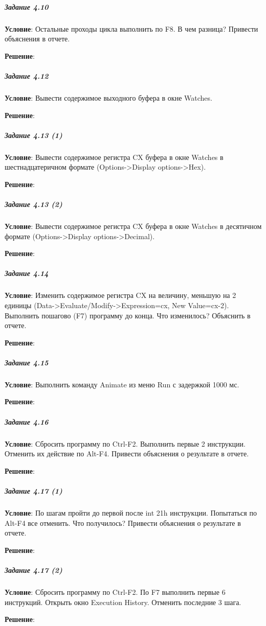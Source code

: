 \subparagraph{Задание 4.10}

\textbf{Условие}:
Остальные проходы цикла выполнить по F8. В чем разница? Привести объяснения в отчете.

\textbf{Решение}:



\subparagraph{Задание 4.12}

\textbf{Условие}: Вывести содержимое выходного буфера в окне Watches. 

\textbf{Решение}:



\subparagraph{Задание 4.13 (1)}

\textbf{Условие}: Вывести содержимое регистра CX буфера в окне Watches в шестнадцатеричном формате (Options->Display options->Hex).

\textbf{Решение}:



\subparagraph{Задание 4.13 (2)}

\textbf{Условие}:
Вывести содержимое регистра CX буфера в окне Watches в десятичном формате (Options->Display options->Decimal).

\textbf{Решение}:



\subparagraph{Задание 4.14}

\textbf{Условие}:
Изменить содержимое регистра CX на величину, меньшую на 2 единицы (Data->Evaluate/Modify->Expression=cx, New Value=cx-2). Выполнить пошагово (F7) программу до конца. Что изменилось? Объяснить в отчете.

\textbf{Решение}:



\subparagraph{Задание 4.15}

\textbf{Условие}:
Выполнить команду Animate из меню Run с задержкой 1000 мс.

\textbf{Решение}:



\subparagraph{Задание 4.16}

\textbf{Условие}:
Сбросить программу по Ctrl-F2. Выполнить первые 2 инструкции. Отменить их действие по Alt-F4. Привести объяснения о результате в отчете.

\textbf{Решение}:



\subparagraph{Задание 4.17 (1)}

\textbf{Условие}:
По шагам пройти до первой после int 21h инструкции. Попытаться по Alt-F4 все отменить. Что получилось? Привести объяснения о результате в отчете.

\textbf{Решение}:



\subparagraph{Задание 4.17 (2)}

\textbf{Условие}:
Сбросить программу по Ctrl-F2. По F7 выполнить первые 6 инструкций. Открыть окно Execution History. Отменить последние 3 шага.

\textbf{Решение}:



